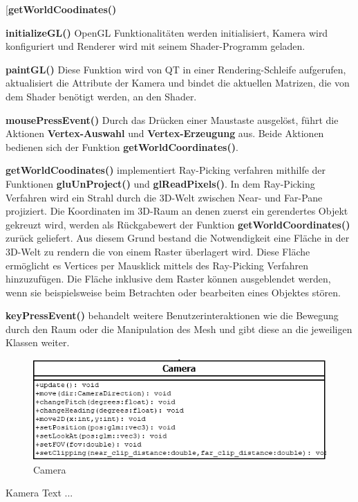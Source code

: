 	\begin{labeling}[]{[\textbf{getWorldCoodinates()}}%
	\item[\textbf{initializeGL()}] OpenGL Funktionalitäten werden initialisiert, Kamera wird konfiguriert und Renderer wird mit seinem Shader-Programm geladen.
	\item[\textbf{paintGL()}] Diese Funktion wird von QT in einer Rendering-Schleife aufgerufen, aktualisiert die Attribute der Kamera und bindet  die aktuellen Matrizen, die von dem Shader benötigt werden, an den Shader.
	\item[\textbf{mousePressEvent()}] Durch das Drücken einer Maustaste ausgelöst, führt die Aktionen \textbf{Vertex-Auswahl} und \textbf{Vertex-Erzeugung} aus. Beide Aktionen bedienen sich der Funktion \textbf{getWorldCoordinates()}.
	\item[\textbf{getWorldCoodinates()}]  implementiert Ray-Picking verfahren mithilfe der Funktionen \textbf{gluUnProject()} und \textbf{glReadPixels()}. In dem Ray-Picking Verfahren wird ein Strahl durch die 3D-Welt zwischen Near- und Far-Pane projiziert. Die Koordinaten im 3D-Raum an denen zuerst ein gerendertes Objekt gekreuzt wird, werden als Rückgabewert der Funktion \textbf{getWorldCoordinates()} zurück geliefert. Aus diesem Grund bestand die Notwendigkeit eine Fläche in der 3D-Welt zu rendern die von einem Raster überlagert wird. Diese Fläche ermöglicht es Vertices per Mausklick mittels des Ray-Picking Verfahren hinzuzufügen. Die Fläche inklusive dem Raster können ausgeblendet werden, wenn sie beispielsweise beim Betrachten oder bearbeiten eines Objektes stören.
	\item[\textbf{keyPressEvent()}] behandelt weitere Benutzerinteraktionen wie die Bewegung durch den Raum oder die Manipulation des Mesh und gibt diese an die jeweiligen Klassen weiter.
	\end{labeling}
		
	\begin{figure}[H]
	\centering
	\includegraphics[width=0.7\linewidth]{camera.png}
	\caption{Camera}
	\label{fig3}
	\end{figure}

Kamera Text ...

